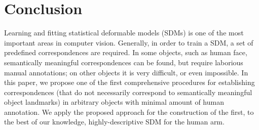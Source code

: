 


\section{Conclusion}
Learning and fitting statistical deformable models (SDMs) is one of the most important areas in computer vision. Generally, in order to train a SDM, a set of predefined correspondences are required. In some objects, such as human face, semantically meaningful correspondences can be found, but require laborious manual annotations; on other objects it is very difficult, or even impossible. In this paper, we propose one of the first comprehensive procedures for establishing correspondences (that do not necessarily correspond to semantically meaningful object landmarks) in arbitrary objects with minimal amount of human annotation. We apply the proposed approach for the construction of the first, to the best of our knowledge, highly-descriptive SDM for the human arm. 

